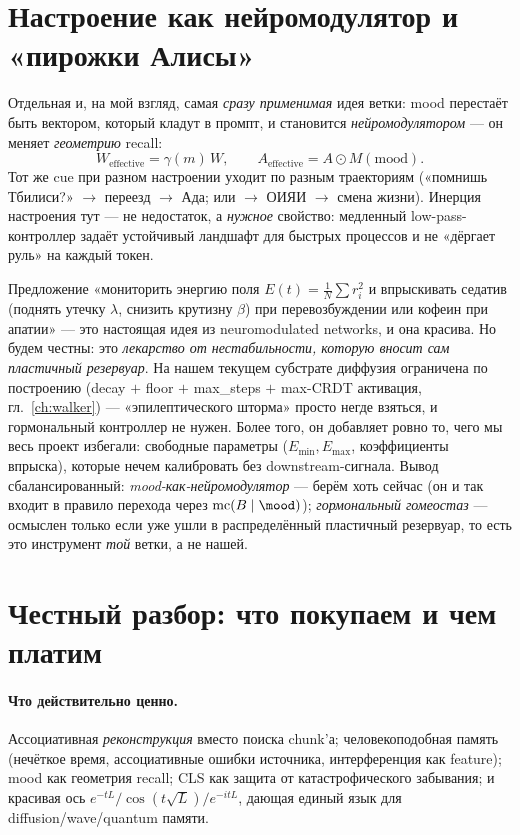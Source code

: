 \section{Настроение как нейромодулятор и «пирожки Алисы»}

Отдельная и, на мой взгляд, самая \emph{сразу применимая} идея ветки: mood перестаёт быть
вектором, который кладут в промпт, и становится \emph{нейромодулятором} — он меняет
\emph{геометрию} recall:
\[
W_{\text{effective}} = \gamma(m)\,W,\qquad
A_{\text{effective}} = A\odot M(\mathrm{mood}).
\]
Тот же cue при разном настроении уходит по разным траекториям («помнишь Тбилиси?» $\to$ переезд
$\to$ Ада; или $\to$ ОИЯИ $\to$ смена жизни). Инерция настроения тут — не недостаток, а
\emph{нужное} свойство: медленный low-pass-контроллер задаёт устойчивый ландшафт для быстрых
процессов и не «дёргает руль» на каждый токен.

\begin{intuition}
Предложение «мониторить энергию поля $E(t)=\frac1N\sum r_i^2$ и впрыскивать седатив (поднять
утечку $\lambda$, снизить крутизну $\beta$) при перевозбуждении или кофеин при апатии» — это
настоящая идея из neuromodulated networks, и она красива. Но будем честны: это \emph{лекарство
от нестабильности, которую вносит сам пластичный резервуар}. На нашем текущем субстрате
диффузия ограничена по построению (decay $+$ floor $+$ max\_steps $+$ max-CRDT активация,
гл.~\ref{ch:walker}) — «эпилептического шторма» просто негде взяться, и гормональный
контроллер не нужен. Более того, он добавляет ровно то, чего мы весь проект избегали:
свободные параметры ($E_{\min},E_{\max}$, коэффициенты впрыска), которые нечем калибровать без
downstream-сигнала. Вывод сбалансированный: \emph{mood-как-нейромодулятор} — берём хоть сейчас
(он и так входит в правило перехода через $\mathrm{mc}(B\mid\mood)$); \emph{гормональный
гомеостаз} — осмыслен только если уже ушли в распределённый пластичный резервуар, то есть это
инструмент \emph{той} ветки, а не нашей.
\end{intuition}

\section{Честный разбор: что покупаем и чем платим}

\paragraph{Что действительно ценно.} Ассоциативная \emph{реконструкция} вместо поиска chunk'а;
человекоподобная память (нечёткое время, ассоциативные ошибки источника, интерференция как
feature); mood как геометрия recall; CLS как защита от катастрофического забывания; и красивая
ось $e^{-tL}/\cos(t\sqrt L)/e^{-itL}$, дающая единый язык для diffusion/wave/quantum памяти.

